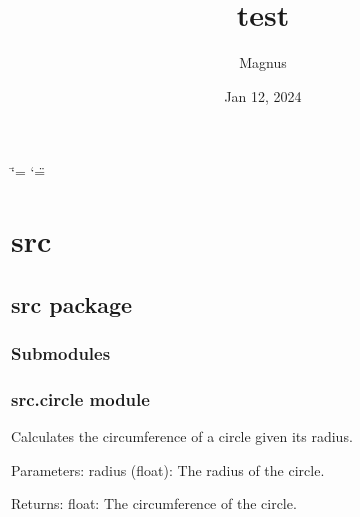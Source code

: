\documentclass[letterpaper,10pt,english]{sphinxmanual}
\title{test}
\date{Jan 12, 2024}
\author{Magnus}
\begin{document}
\ifdefined\shorthandoff
  \ifnum\catcode`\=\string=\active\shorthandoff{=}\fi
  \ifnum\catcode`\"=\active{}\fi
\fi

\pagestyle{empty}
\sphinxmaketitle
\pagestyle{plain}
\sphinxtableofcontents
\pagestyle{normal}
\label{\detokenize{index::doc}}


\sphinxstepscope


\chapter{src}
\label{\detokenize{modules:src}}\label{\detokenize{modules::doc}}
\sphinxstepscope


\section{src package}
\label{\detokenize{src:src-package}}\label{\detokenize{src::doc}}

\subsection{Submodules}
\label{\detokenize{src:submodules}}

\subsection{src.circle module}
\label{\detokenize{src:module-src.circle}}\label{\detokenize{src:src-circle-module}}

\begin{fulllineitems}
\label{\detokenize{src:src.circle.calculate_circumference}}
\pysigstartsignatures
{}
\pysigstopsignatures
\sphinxAtStartPar
Calculates the circumference of a circle given its radius.

\sphinxAtStartPar
Parameters:
radius (float): The radius of the circle.

\sphinxAtStartPar
Returns:
float: The circumference of the circle.

\end{fulllineitems}
\end{document}
